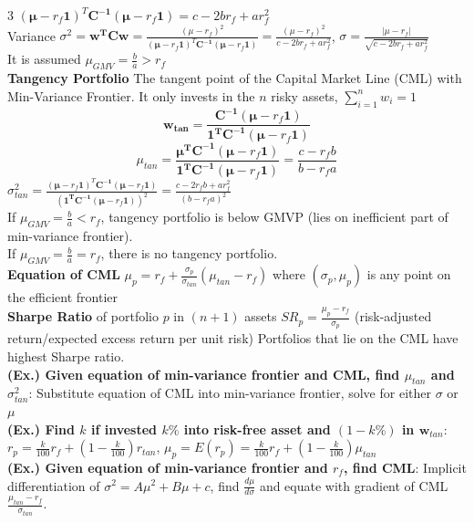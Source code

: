 \documentclass{article}
\begin{document}
{\begin{multicols*}{3}
$(\boldsymbol{\mu}-r_f\boldsymbol{1})^T\boldsymbol{C^{-1}}(\boldsymbol{\mu}-r_f\boldsymbol{1}) = c-2br_f+ar_f^2$\\
Variance $\sigma^2=\boldsymbol{w^TCw}=\frac{(\mu-r_f)^2}{(\boldsymbol{\mu}-r_f\boldsymbol{1})^T\boldsymbol{C^{-1}}(\boldsymbol{\mu}-r_f\boldsymbol{1})}=\frac{(\mu-r_f)^2}{c-2br_f+ar_f^2}$, $\sigma=\frac{|\mu-r_f|}{\sqrt{c-2br_f+ar_f^2}}$\\
It is assumed $\mu_{GMV}=\frac{b}{a}>r_f$\\
\textbf{Tangency Portfolio} The tangent point of the Capital Market Line (CML) with Min-Variance Frontier. It only invests in the $n$ risky assets, $\sum_{i=1}^nw_i=1$\\
$$\boldsymbol{w_{tan}}=\frac{\boldsymbol{C^{-1}}(\boldsymbol{\mu}-r_f\boldsymbol{1})}{\boldsymbol{1^TC^{-1}}(\boldsymbol{\mu}-r_f\boldsymbol{1})}$$
$$\mu_{tan}=\frac{\boldsymbol{\mu^T C^{-1}}(\boldsymbol{\mu}-r_f\boldsymbol{1})}{\boldsymbol{1^T C^{-1}}(\boldsymbol{\mu}-r_f\boldsymbol{1})}=\frac{c-r_fb}{b-r_fa}$$
$\sigma_{tan}^2=\frac{(\boldsymbol{\mu}-r_f\boldsymbol{1})^T\boldsymbol{C^{-1}}(\boldsymbol{\mu}-r_f\boldsymbol{1})}{(\boldsymbol{1^T}\boldsymbol{C^{-1}}(\boldsymbol{\mu}-r_f\boldsymbol{1}))^2}=\frac{c-2r_fb+ar_f^2}{(b-r_fa)^2}$\\
If $\mu_{GMV}=\frac{b}{a}<r_f$, tangency portfolio is below GMVP (lies on inefficient part of min-variance frontier). \\
If $\mu_{GMV}=\frac{b}{a}=r_f$, there is no tangency portfolio. \\
\textbf{Equation of CML} $\mu_p=r_f+\frac{\sigma_p}{\sigma_{tan}}(\mu_{tan}-r_f)$ where $(\sigma_p, \mu_p)$ is any point on the efficient frontier\\
\textbf{Sharpe Ratio} of portfolio $p$ in $(n+1)$ assets $SR_p=\frac{\mu_p-r_f}{\sigma_p}$ (risk-adjusted return/expected excess return per unit risk) Portfolios that lie on the CML have highest Sharpe ratio.\\
\textbf{(Ex.) Given equation of min-variance frontier and CML, find $\mu_{tan}$ and $\sigma^2_{tan}$}: Substitute equation of CML into min-variance frontier, solve for either $\sigma$ or $\mu$\\
\textbf{(Ex.) Find $k$ if invested $k\%$ into risk-free asset and $(1-k\%)$ in $\boldsymbol{w}_{tan}$}: \\
$r_p=\frac{k}{100}r_f+(1-\frac{k}{100})r_{tan}$, $\mu_p=E(r_p)=\frac{k}{100}r_f+(1-\frac{k}{100})\mu_{tan}$\\
\textbf{(Ex.) Given equation of min-variance frontier and $r_f$, find CML}: Implicit differentiation of $\sigma^2=A\mu^2+B\mu+c$, find $\frac{d\mu}{d\sigma}$ and equate with gradient of CML $\frac{\mu_{tan}-r_f}{\sigma_{tan}}$. 


\end{multicols*}}
\end{document}

